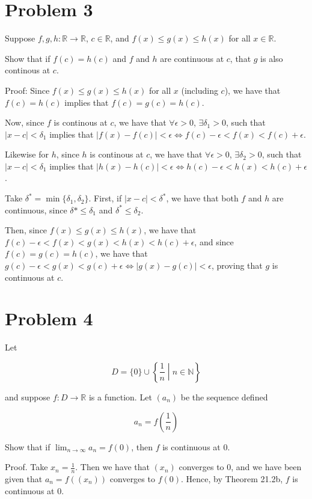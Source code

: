 \documentclass{article}
\begin{document}
\section*{Problem 3}

Suppose $f, g, h: \mathbb{R} \rightarrow \mathbb{R}$, $c \in \mathbb{R}$, and $f(x) \leq g(x) \leq h(x)$ for all $x \in \mathbb{R}$. 

Show that if $f(c) = h(c)$ and $f$ and $h$ are continuous at $c$, that $g$ is also continous at $c$. 

Proof: Since $f(x) \leq g(x) \leq h(x)$ for all $x$ (including $c$), we have that $f(c) = h(c)$ implies that $f(c) = g(c) = h(c)$. 

Now, since $f$ is continous at $c$, we have that $\forall \epsilon > 0$, $\exists \delta_1 > 0$, such that $\left|x - c\right| < \delta_1$ implies that $\left|f(x) - f(c)\right| < \epsilon \Leftrightarrow f(c) - \epsilon < f(x) < f(c) + \epsilon$. 

Likewise for $h$, since $h$ is continous at $c$, we have that $\forall \epsilon > 0$, $\exists \delta_2 > 0$, such that $\left|x - c\right| < \delta_1$ implies that $\left|h(x) - h(c)\right| < \epsilon \Leftrightarrow h(c) - \epsilon < h(x) < h(c) + \epsilon$.

Take $\delta^* = \min\{\delta_1, \delta_2\}$. First, if $\left|x - c\right| < \delta^*$, we have that both $f$ and $h$ are continuous, since $\delta* \leq \delta_1$ and $\delta^* \leq \delta_2$. 

Then, since $f(x) \leq g(x) \leq h(x)$, we have that $f(c) - \epsilon < f(x) < g(x) < h(x) < h(c) + \epsilon$, and since $f(c) = g(c) = h(c)$, we have that $g(c) - \epsilon < g(x) < g(c) + \epsilon \Leftrightarrow \left|g(x) - g(c)\right| < \epsilon$, proving that $g$ is continuous at $c$. 

\section*{Problem 4}

Let

\begin{equation*}
        D = \{0\} \cup \left\{\frac{1}{n}\middle | n \in \mathbb{N}\right\}
\end{equation*}

and suppose $f: D \rightarrow \mathbb{R}$ is a function. Let $(a_n)$ be the sequence defined 

\begin{equation*}
        a_n = f\left(\frac{1}{n}\right)
\end{equation*}

Show that if $\lim_{n \rightarrow \infty} a_n = f(0)$, then $f$ is continuous at 0. 

Proof. Take $x_n = \frac{1}{n}$. Then we have that $(x_n)$ converges to 0, and we have been given that $a_n = f((x_n))$ converges to $f(0)$. Hence, by Theorem 21.2b, $f$ is continuous at 0. 
\end{document}
